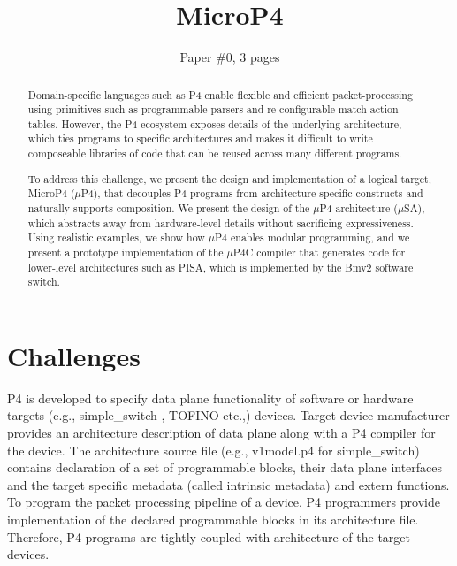 \documentclass{hotnets19}
\begin{document}


\title{MicroP4}

\author{Paper \#0, 3 pages}

\maketitle

\begin{abstract}
Domain-specific languages such as P4 enable flexible and efficient
packet-processing using primitives such as programmable parsers and
re-configurable match-action tables. However, the P4 ecosystem exposes
details of the underlying architecture, which ties programs to
specific architectures and makes it difficult to write composeable
libraries of code that can be reused across many different programs.

To address this challenge, we present the design and implementation of
a logical target, MicroP4 ($\mu$P4), that decouples P4 programs from
architecture-specific constructs and naturally supports composition.
We present the design of the $\mu$P4 architecture ($\mu$SA), which
abstracts away from hardware-level details without sacrificing
expressiveness. Using realistic examples, we show how $\mu$P4 enables
modular programming, and we present a prototype implementation of the
$\mu$P4C compiler that generates code for lower-level architectures
such as PISA, which is implemented by the Bmv2 software switch.
\end{abstract}




\section{Challenges}
P4 is developed to specify data plane functionality of software or hardware targets (e.g., simple\_\-switch \cite{simple_switch.md}, TOFINO \cite{tofino} etc.,) devices.
Target device manufacturer provides an architecture description of data plane along with a P4 compiler for the device.
The architecture source file (e.g., v1\-mod\-el\-.p4 \cite{v1model.p4} for simple\_switch) contains declaration of a set of pro\-gram\-ma\-ble blocks, their data plane interfaces and the target specific metadata (called intrinsic metadata) and extern functions.
To program the packet processing pipeline of a device, P4 programmers provide implementation of the declared programmable blocks in its architecture file.
Therefore, P4 programs are tightly coupled with architecture of the target devices.
\end{document}

